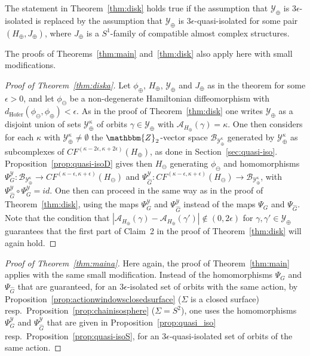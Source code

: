 \documentclass[AHL,Unicode,longabstracts,published]{cedram}
\newcommand{\id}{id}
\newcommand{\Z}{\mathbbm{Z}}
\newcommand{\hofer}{\mathrm{Hofer}}
\newcommand{\clY}{\mathcal{Y}}
\newcommand{\clA}{\mathcal{A}}
\newcommand{\clB}{\mathcal{B}}
\newcommand{\hofer}{\mathrm{Hofer}}
\begin{document}
\begin{theo}\label{thm:diska}
The statement in Theorem~\ref{thm:disk} holds true if the assumption that $\clY_{\oplus}$ is $3\epsilon$-isolated is replaced by the assumption that $\clY_{\oplus}$ is $3\epsilon$-quasi-isolated for some pair $(H_{\oplus}, J_{\oplus})$, where $J_\oplus$ is a $S^1$-family of compatible almost complex structures.
\end{theo}


The proofs of Theorems~\ref{thm:main} and~\ref{thm:disk} also apply here with small modifications.


\begin{proof}[{Proof of Theorem~\ref{thm:diska}}]
Let $\phi_{\oplus}$, $H_{\oplus}$, $\clY_{\oplus}$ and $J_{\oplus}$ as in the theorem for some $\epsilon>0$, and let $\phi_{\ominus}$ be a non-degenerate Hamiltonian diffeomorphism with $d_{\hofer}(\phi_{\ominus}, \phi_{\oplus}) < \epsilon$. As in the proof of Theorem~\ref{thm:disk} one writes $\clY_{\oplus}$ as a disjoint union of sets $\clY_{\oplus}^{\kappa}$ of orbits $\gamma\in \clY_{\oplus}$ with $\clA_{H_{\oplus}}(\gamma) = \kappa$. One then considers for each $\kappa$ with $\clY_{\oplus}^{\kappa} \neq \emptyset$ the $\Z_2$-vector space $\clB_{\clY^{\kappa}_{\oplus}}$ generated by $\clY_{\oplus}^{\kappa}$ as subcomplexes of $CF^{(\kappa-2\epsilon, \kappa + 2\epsilon)}(H_{\oplus})$, as done in Section~\ref{sec:quasi-iso}. Proposition~\ref{prop:quasi-isoD} gives then $H_{\ominus}$ generating $\phi_{\ominus}$ and homomorphisms $\Psi^{\clY}_G: \clB_{\clY^{\kappa}_{\oplus}} \to CF^{(\kappa - \epsilon, \kappa + \epsilon)}(H_{\ominus})$ and $\Psi^{\clY}_{\widehat{G}}:CF^{(\kappa - \epsilon, \kappa + \epsilon)}(H_{\ominus}) \to \clB_{\clY^{\kappa}_{\oplus}}$, with $\Psi^{\clY}_{\widehat{G}}\circ \Psi^{\clY}_G = \id$. One then can proceed in the same way as in the proof of Theorem~\ref{thm:disk}, using the maps $\Psi^{\clY}_G$ and $\Psi^{\clY}_{\widehat{G}}$ instead of the maps $\Psi_G$ and $\Psi_{\widehat{G}}$. Note that the condition that $|\clA_{H_{\oplus}}(\gamma) - \clA_{H_{\oplus}}(\gamma')|\notin(0,2\epsilon)$ for $\gamma, \gamma'\in \clY_{\oplus}$ guarantees that the first part of Claim~2 in the proof of Theorem~\ref{thm:disk} will again hold.
\end{proof}

\begin{proof}[{Proof of Theorem~\ref{thm:maina}}]
Here again, the proof of Theorem~\ref{thm:main} applies with the same small modification. Instead of the homomorphisms $\Psi_{G}$ and $\Psi_{\widehat{G}}$ that are guaranteed, for an $3\epsilon$-isolated set of orbits with the same action, by Proposition~\ref{prop:actionwindowsclosedsurface} ($\Sigma$ is a closed surface) resp.\ Proposition~\ref{prop:chainisosphere} ($\Sigma = S^2$), one uses the homomorphisms $\Psi^{\clY}_{G}$ and $\Psi^{\clY}_{\widehat{G}}$ that are given in Proposition~\ref{prop:quasi_iso} resp.\ Proposition~\ref{prop:quasi-isoS}, for an $3\epsilon$-quasi-isolated set of orbits of the same action.
\end{proof}
\end{document}
